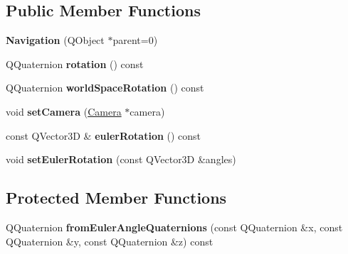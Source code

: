 \subsection*{Public Member Functions}
\begin{DoxyCompactItemize}
\item 
\hypertarget{class_navigation_a9848e09ca6fab3590ffdb0e1c188f31d}{}{\bfseries Navigation} (Q\+Object $\ast$parent=0)\label{class_navigation_a9848e09ca6fab3590ffdb0e1c188f31d}

\item 
\hypertarget{class_navigation_a264e178e874b62aec38c9986a234d044}{}Q\+Quaternion {\bfseries rotation} () const \label{class_navigation_a264e178e874b62aec38c9986a234d044}

\item 
\hypertarget{class_navigation_adedf1fd31c40b2ba7461f67387bbb00c}{}Q\+Quaternion {\bfseries world\+Space\+Rotation} () const \label{class_navigation_adedf1fd31c40b2ba7461f67387bbb00c}

\item 
\hypertarget{class_navigation_a945e0c9bd30f3c66da040f3242864027}{}void {\bfseries set\+Camera} (\hyperlink{class_camera}{Camera} $\ast$camera)\label{class_navigation_a945e0c9bd30f3c66da040f3242864027}

\item 
\hypertarget{class_navigation_ac756f0b773b771556505a8f20a5f2cf1}{}const Q\+Vector3\+D \& {\bfseries euler\+Rotation} () const \label{class_navigation_ac756f0b773b771556505a8f20a5f2cf1}

\item 
\hypertarget{class_navigation_a4d9b8c12ac091a1db0c3b89f0e36cedd}{}void {\bfseries set\+Euler\+Rotation} (const Q\+Vector3\+D \&angles)\label{class_navigation_a4d9b8c12ac091a1db0c3b89f0e36cedd}

\end{DoxyCompactItemize}
\subsection*{Protected Member Functions}
\begin{DoxyCompactItemize}
\item 
\hypertarget{class_navigation_a210a31fd6fc626468793b4dbeefcaf2c}{}Q\+Quaternion {\bfseries from\+Euler\+Angle\+Quaternions} (const Q\+Quaternion \&x, const Q\+Quaternion \&y, const Q\+Quaternion \&z) const \label{class_navigation_a210a31fd6fc626468793b4dbeefcaf2c}

\end{DoxyCompactItemize}
